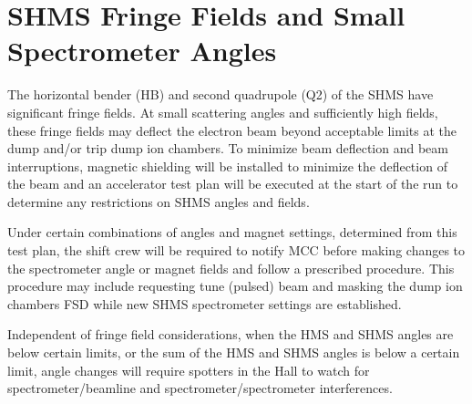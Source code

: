 
\section{SHMS Fringe Fields and Small Spectrometer Angles}
The horizontal bender (HB) and second quadrupole (Q2) of the SHMS have
significant fringe fields.  At small scattering angles and
sufficiently high fields, these fringe fields may deflect the
electron beam beyond acceptable limits at the dump and/or
trip dump ion chambers.  To minimize beam deflection and beam
interruptions,
magnetic shielding will be installed to minimize the deflection of the beam and
an accelerator test plan will be executed at the start of the run to determine
any restrictions on SHMS angles and fields.

Under certain combinations of angles and magnet settings, determined
from this test plan,
the shift crew will be required to notify MCC before making changes to
the spectrometer angle or magnet fields and follow a prescribed procedure.
This procedure may include requesting tune (pulsed) beam and masking the
dump ion chambers FSD while new SHMS spectrometer settings are established.

Independent of fringe field considerations, when the HMS and SHMS angles are
below certain limits, or the sum of the HMS and SHMS angles is below a certain
limit, angle changes will require spotters in the Hall to watch for
spectrometer/beamline and spectrometer/spectrometer interferences.



